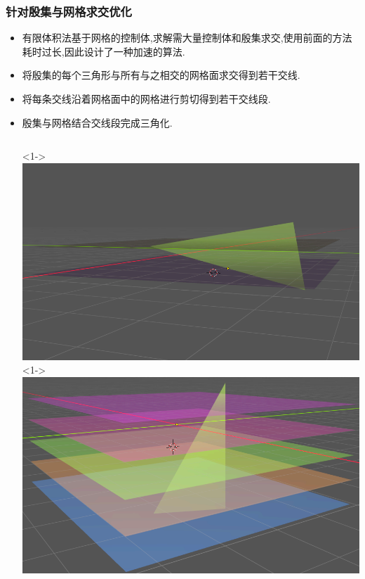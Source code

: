 \documentclass[UTF8]{ctexbeamer}	%
\theoremstyle{plain}
\theoremstyle{definition}
\theoremstyle{remark}
\numberwithin{equation}{section}
\begin{document}
\begin{frame}
    \frametitle{针对殷集与网格求交优化}
    \begin{itemize}
    \item 有限体积法基于网格的控制体,求解需大量控制体和殷集求交,使用前面的方法耗时过长,因此设计了一种加速的算法.
    \item 将殷集的每个三角形与所有与之相交的网格面求交得到若干交线.
      \item 将每条交线沿着网格面中的网格进行剪切得到若干交线段.
      \item 殷集与网格结合交线段完成三角化.
        \vspace{0.2in}
         \begin{columns}
        <1->
        \includegraphics[width = \textwidth]{fig/swem.png}
        <1->
        \includegraphics[width = \textwidth]{fig/sw2em.png}
    \end{columns}
    \end{itemize}
\end{frame}
\end{document}
